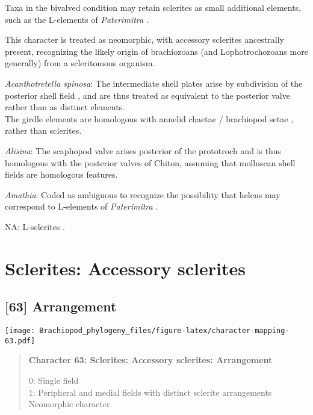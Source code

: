 \documentclass[openany]{book}
\theoremstyle{definition}
\theoremstyle{definition}
\theoremstyle{definition}
\theoremstyle{remark}
\begin{document}
Taxa in the bivalved condition may retain sclerites as small additional
elements, such as the L-elements of \emph{Paterimitra}
\citep{Skovsted2015Theearly}.

This character is treated as neomorphic, with accessory sclerites
ancestrally present, recognizing the likely origin of brachiozoans (and
Lophotrochozoans more generally) from a scleritomous organism.

\hypertarget{Acanthotretella_spinosa-coding-62}{}
\emph{Acanthotretella spinosa}: The intermediate shell plates arise by
subdivision of the posterior shell field \citep{Wanninger2002C}, and are
thus treated as equivalent to the posterior valve rather than as
distinct elements.\\
The girdle elements are homologous with annelid chaetae / brachiopod
setae \citep{Leise1982}, rather than sclerites.

\hypertarget{Alisina-coding-62}{}
\emph{Alisina}: The scaphopod valve arises posterior of the prototroch
and is thus homologous with the posterior valves of Chiton, assuming
that molluscan shell fields are homologous features.

\hypertarget{Amathia-coding-62}{}
\emph{Amathia}: Coded as ambiguous to recognize the possibility that
helens may correspond to L-elements of \emph{Paterimitra}
\citep{Moysiuk2017Hyolithsare}.

\hypertarget{NA-coding-62}{}
NA: L-sclerites \citep{Skovsted2009Thescleritome}.

\section{Sclerites: Accessory
sclerites}\label{sclerites-accessory-sclerites}

\subsection*{{[}63{]} Arrangement}\label{arrangement}

\texttt{[image: Brachiopod\_phylogeny\_files/figure-latex/character-mapping-63.pdf]}

\begin{quote}
\textbf{Character 63: Sclerites: Accessory sclerites: Arrangement}

0: Single field\\
1: Peripheral and medial fields with distinct sclerite arrangements\\
Neomorphic character.
\end{quote}
\end{document}
